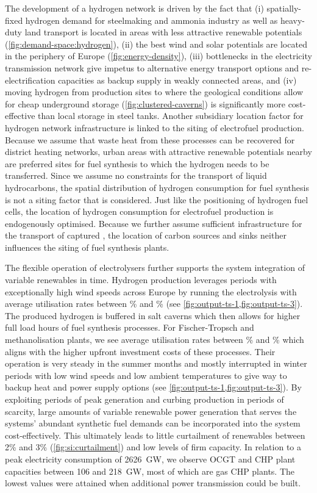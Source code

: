 The development of a hydrogen network is driven by the fact that (i)
spatially-fixed hydrogen demand for steelmaking and ammonia industry as well as
heavy-duty land transport is located in areas with less attractive renewable
potentials (\cref{fig:demand-space:hydrogen}), (ii) the best wind and solar
potentials are located in the periphery of Europe (\cref{fig:energy-density}),
(iii) bottlenecks in the electricity transmission network give impetus to
alternative energy transport options and re-electrification capacities as backup
supply in weakly connected areas, and (iv) moving hydrogen from production sites
to where the geological conditions allow for cheap underground storage
(\cref{fig:clustered-caverns}) is significantly more cost-effective than local
storage in steel tanks. Another subsidiary location factor for hydrogen network
infrastructure is linked to the siting of electrofuel production. Because we
assume that waste heat from these processes can be recovered for district
heating networks, urban areas with attractive renewable potentials nearby are
preferred sites for fuel synthesis to which the hydrogen needs to be
transferred. Since we assume no constraints for the transport of liquid
hydrocarbons, the spatial distribution of hydrogen consumption for fuel
synthesis is not a siting factor that is considered. Just like the positioning
of hydrogen fuel cells, the location of hydrogen consumption for electrofuel
production is endogenously optimised. Because we further assume sufficient
infrastructure for the transport of captured \co, the location of carbon sources
and sinks neither influences the siting of fuel synthesis plants.

The flexible operation of electrolysers further supports the system integration
of variable renewables in time. Hydrogen production leverages periods with
exceptionally high wind speeds across Europe by running the electrolysis with
average utilisation rates between \mincfelectrolysis\% and \maxcfelectrolysis\%
(see \cref{fig:output-ts-1,fig:output-ts-3}). The produced hydrogen is buffered
in salt caverns which then allows for higher full load hours of fuel synthesis
processes. For Fischer-Tropsch and methanolisation plants, we see average
utilisation rates between \mincfFT\% and \maxcfFT\% which aligns with the higher
upfront investment costs of these processes. Their operation is very steady in
the summer months and mostly interrupted in winter periods with low wind speeds
and low ambient temperatures to give way to backup heat and power supply options
(see \cref{fig:output-ts-1,fig:output-ts-3}). By exploiting periods of peak
generation and curbing production in periods of scarcity, large amounts of
variable renewable power generation that serves the systems' abundant synthetic
fuel demands can be incorporated into the system cost-effectively. This
ultimately leads to little curtailment of renewables between 2\% and 3\%
(\cref{fig:si:curtailment}) and low levels of firm capacity. In relation to a
peak electricity consumption of 2626~GW\el, we observe OCGT and CHP plant
capacities between 106 and 218~GW\el, most of which are gas CHP plants. The
lowest values were attained when additional power transmission could be built.

